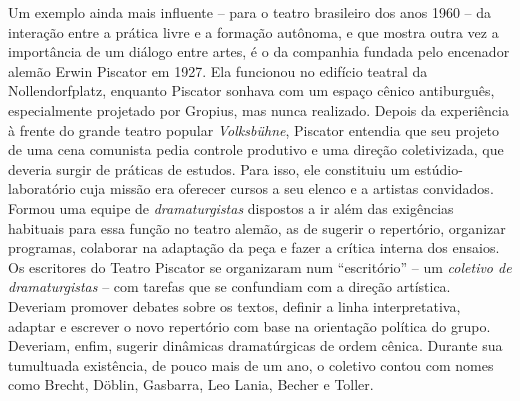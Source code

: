 Um exemplo ainda mais influente -- para o teatro brasileiro dos anos 1960
-- da interação entre a prática livre e a formação autônoma, e
que mostra outra vez a importância de um diálogo entre artes, é o da
companhia fundada pelo encenador alemão Erwin Piscator em 1927. Ela
funcionou no edifício teatral da Nollendorfplatz, enquanto Piscator
sonhava com um espaço cênico antiburguês, especialmente projetado por
Gropius, mas nunca realizado. Depois da experiência à frente do grande
teatro popular {\it Volksbühne}, Piscator entendia que seu projeto de
uma cena comunista pedia controle produtivo e uma direção coletivizada,
que deveria surgir de práticas de estudos. Para isso, ele constituiu um
estúdio-laboratório cuja missão era oferecer cursos a seu elenco e
a artistas convidados. Formou uma equipe de {\it dramaturgistas}
dispostos a ir além das exigências habituais para essa função no
teatro alemão, as de sugerir o repertório, organizar programas,
colaborar na adaptação da peça e fazer a crítica interna dos ensaios.
Os escritores do Teatro Piscator se organizaram num “escritório” -- um
{\it coletivo de dramaturgistas} -- com tarefas que se confundiam com a
direção artística. Deveriam promover debates sobre os textos, definir a
linha interpretativa, adaptar e escrever o novo repertório com base na
orientação política do grupo. Deveriam, enfim, sugerir dinâmicas dramatúrgicas
de ordem cênica. Durante sua tumultuada existência, de pouco mais de um ano,
o coletivo contou com nomes como Brecht, Döblin, Gasbarra, Leo Lania,
Becher e Toller.


